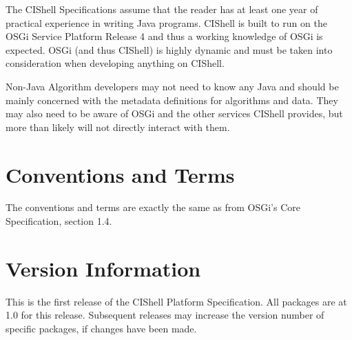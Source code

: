 The CIShell Specifications assume that the reader has at least one year of
practical experience in writing Java programs. CIShell is built to run on the
OSGi Service Platform Release 4 and thus a working knowledge of OSGi is expected.
OSGi (and thus CIShell) is highly dynamic and must be taken into consideration
when developing anything on CIShell.

Non-Java Algorithm developers may not need to know any Java and should be mainly
concerned with the metadata definitions for algorithms and data. They may also
need to be aware of OSGi and the other services CIShell provides, but more than
likely will not directly interact with them.

\section{Conventions and Terms}

The conventions and terms are exactly the same as from OSGi's Core
Specification, section 1.4.

\section{Version Information}

This is the first release of the CIShell Platform Specification. All packages are
at 1.0 for this release. Subsequent releases may increase the version number of
specific packages, if changes have been made.
